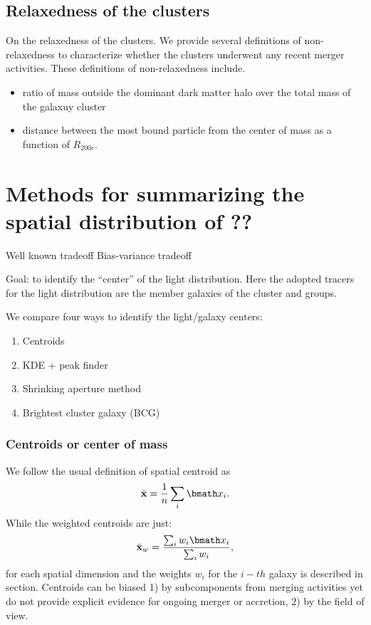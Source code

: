 \documentclass[usenatbib]{mn2e}
\renewcommand{\vec}[1]{ {\bmath #1} }
\begin{document}
\subsection{Relaxedness of the clusters}
On the relaxedness of the clusters.
We provide several definitions of non-relaxedness to characterize whether
the clusters underwent any recent merger activities. 
These definitions of non-relaxedness include.
\begin{itemize}
	\item ratio of mass outside the dominant dark matter halo over the total mass
		of the galaxuy cluster 
	\item distance between the most bound particle from the center of mass as a
		function of $R_{200c}$.
\end{itemize}


\section{Methods for summarizing the spatial distribution of ??}

Well known tradeoff Bias-variance tradeoff



Goal: to identify the ``center'' of the light distribution. Here the adopted tracers for the light distribution are the member galaxies of the cluster and groups.

We compare four ways to identify the light/galaxy centers:
\begin{enumerate}
\item Centroids
\item KDE + peak finder
\item Shrinking aperture method
\item Brightest cluster galaxy (BCG)

\end{enumerate}

\subsubsection{Centroids or center of mass}
\label{Unweighted}
We follow the usual definition of spatial centroid as 
\begin{equation}
	\bar{\bf x} = \frac{1}{n} \sum_i \vec{x}_i. 
\end{equation}
While the weighted centroids are just: 
\begin{equation}
	\bar{\bf x}_w = \frac{\sum_i w_i \vec{x}_i}{\sum_i w_i},
\end{equation}
for each spatial dimension and the weights $w_i$ for the $i-th$ galaxy
is described in section.
Centroids can be biased 1) by subcomponents from merging activities yet do
not provide explicit evidence for ongoing merger or accretion, 2) by the 
field of view.
\end{document}
